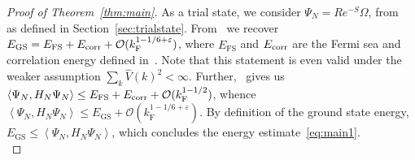 \documentclass[12pt,a4paper]{article}
\numberwithin{equation}{section}
\newcommand{\cO}{\mathcal{O}}
\newcommand{\1}{\mathbb{I}}
\newcommand{\corr}{\textnormal{corr}}
\newcommand{\F}{\mathrm{F}}
\newcommand{\FS}{\mathrm{FS}}
\newcommand{\GS}{\mathrm{GS}}
\newcommand{\eva}[1]{\left\langle #1 \right\rangle}
\theoremstyle{plain}
\theoremstyle{definition}
\theoremstyle{remark}
\theoremstyle{plain}
\theoremstyle{definition}
\theoremstyle{remark}
\begin{document}
\begin{proof}[Proof of Theorem~\ref{thm:main}]
As a trial state, we consider $ \Psi_N = R e^{-S} \Omega $, from~\cite{CHN23} as defined in Section~\ref{sec:trialstate}. From~\cite[Corr.~1.3]{CHN24} we recover $ E_{\GS} = E_{\FS} + E_{\corr} + \cO(k_{\F}^{1 - 1/6 + \varepsilon}) $, where $ E_{\FS} $ and $ E_{\corr} $ are the Fermi sea and correlation energy defined in~\cite[(1.2) and (1.11)]{CHN24}. Note that this statement is even valid under the weaker assumption $ \sum_k \hat{V}(k)^2 < \infty $. Further,~\cite[Thm.~1.1]{CHN23} gives us $ \eva{\Psi_N, H_N \Psi_N} \le E_{\FS} + E_{\corr} + \cO(k_{\F}^{1 - 1/2}) $, whence $ \eva{\Psi_N, H_N \Psi_N} \le E_{\GS} + \cO(k_{\F}^{1 - 1/6+ \varepsilon}) $. By definition of the ground state energy, $ E_{\GS} \le \eva{\Psi_N, H_N \Psi_N} $, which concludes the energy estimate~\eqref{eq:main1}.\\


\end{proof}
\end{document}
